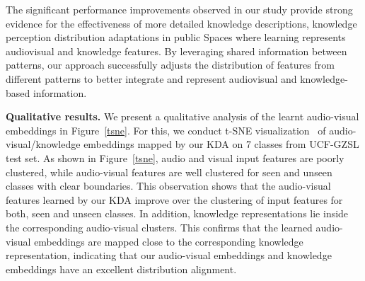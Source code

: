 \documentclass[10pt,twocolumn,letterpaper]{article}
\begin{document}
The significant performance improvements observed in our study provide strong evidence for the effectiveness of more detailed knowledge descriptions, knowledge perception distribution adaptations in public Spaces where learning represents audiovisual and knowledge features. By leveraging shared information between patterns, our approach successfully adjusts the distribution of features from different patterns to better integrate and represent audiovisual and knowledge-based information.

\noindent
\textbf{Qualitative results.}
We present a qualitative analysis of the learnt audio-visual embeddings in Figure~\ref{tsne}. For this, we conduct t-SNE visualization~\cite{hinton_tsne} of audio-visual/knowledge embeddings mapped by our KDA on 7 classes from UCF-GZSL test set.
As shown in Figure~\ref{tsne}, audio and visual input features are poorly clustered, while audio-visual features are well clustered for seen and unseen classes with clear boundaries. This observation shows that the audio-visual features learned by our KDA improve over the clustering of input features for both, seen and unseen classes. 
In addition, knowledge representations lie inside the corresponding audio-visual clusters. This confirms that the learned audio-visual embeddings are mapped close to the corresponding knowledge representation, indicating that our audio-visual embeddings and knowledge embeddings have an excellent distribution alignment.



\begin{table*}[t]
    \centering
    \caption{Ablation study on KDA. The mean class accuracy for GZSL is reported on the seen (S) and unseen (U) test classes, and their harmonic mean (HM). For the ZSL performance, only the test subset of unseen classes is considered.}
    \label{ablation}
\end{table*}
\end{document}
